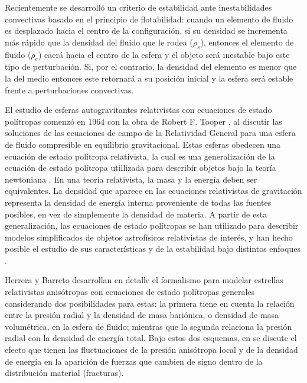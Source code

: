 \documentclass[letterpaper,11pt]{article}
\begin{document}
Recientemente se desarrolló un criterio de estabilidad ante inestabilidades convectivas basado en el principio de flotabilidad: cuando un elemento de fluido es desplazado hacia el centro de la configuración, si su densidad se incrementa más rápido que la densidad del fluido que le rodea ($\rho_s$), entonces el elemento de fluido ($\rho_e$) caerá hacia el centro de la esfera y el objeto será inestable bajo este tipo de perturbación. Si, por el contrario, la densidad del elemento es menor que la del medio entonces este retornará a su posición inicial y la esfera será estable frente a perturbaciones convectivas.

El estudio de esferas autogravitantes relativistas con ecuaciones de estado polítropas comenzó en 1964 con la obra de
Robert F. Tooper \cite{Tooper1964b}, al discutir las soluciones de las ecuaciones de campo de la Relatividad General para una esfera de fluido compresible en equilibrio gravitacional. Estas esferas obedecen una ecuación de estado polítropa relativista, la cual es una generalización de la ecuación de estado polítropa utillizada para describir objetos bajo la teoría newtoniana \cite{chandrasekhar1957introduction}. En una teoría relativista, la masa y la energía deben ser equivalentes. La densidad que aparece en las ecuaciones relativistas de gravitación representa la densidad de energía interna proveniente de todas las fuentes posibles, en vez de simplemente la densidad de materia. A partir de esta generalización, las ecuaciones de estado polítropas se han utilizado para describir modelos simplificados de objetos astrofísicos relativistas de interés, y han hecho posible el estudio de sus características y de la estabilidad bajo distintos enfoques
\cite{bludman1973stability, nilsson2000general, maeda2002no}.

Herrera y Barreto \cite{herrera2013general} desarrollan en detalle el formalismo para modelar estrellas relativistas anisótropas con ecuaciones de estado polítropas generales considerando dos posibilidades para estas: la primera tiene en cuenta la relación entre la presión radial y la densidad de masa bariónica, o densidad de masa volumétrica, en la esfera de fluido; mientras que la segunda relaciona la presión radial con la densidad de energía total. Bajo estos dos esquemas, en \cite{HerreraFuenmayorLeon2016} se discute el efecto que tienen las fluctuaciones de la presión anisótropa local y de la densidad de energía en la aparición de fuerzas que cambien de signo dentro de la distribución material (fracturas).
\end{document}
